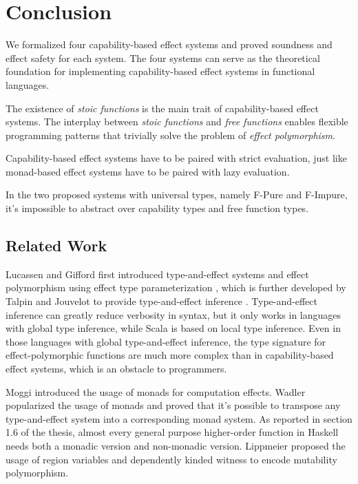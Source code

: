 \section{Conclusion}

We formalized four capability-based effect systems and proved
soundness and effect safety for each system. The four systems can
serve as the theoretical foundation for implementing capability-based
effect systems in functional languages.

The existence of \emph{stoic functions} is the main trait of
capability-based effect systems. The interplay between \emph{stoic
  functions} and \emph{free functions} enables flexible programming
patterns that trivially solve the problem of \emph{effect
  polymorphism}.

Capability-based effect systems have to be paired with strict
evaluation, just like monad-based effect systems have to be paired
with lazy evaluation.

In the two proposed systems with universal types, namely F-Pure and
F-Impure, it's impossible to abstract over capability types and free
function types.

\subsection{Related Work}

Lucassen and Gifford first introduced type-and-effect
systems\cite{gifford1986integrating} and effect polymorphism using
effect type parameterization \cite{lucassen1988polymorphic}, which is
further developed by Talpin and Jouvelot to provide type-and-effect
inference \cite{talpin1992polymorphic,
  talpin1994type}. Type-and-effect inference can greatly reduce
verbosity in syntax, but it only works in languages with global type
inference, while Scala is based on local type inference. Even in those
languages with global type-and-effect inference, the type signature
for effect-polymorphic functions are much more complex than in
capability-based effect systems, which is an obstacle to programmers.

Moggi introduced the usage of monads for computation
effects\cite{moggi1991notions}. Wadler popularized the usage of
monads\cite{wadler1992comprehending, wadler1995monads} and proved that
it's possible to transpose any type-and-effect system into a
corresponding monad system\cite{wadler2003marriage}. As reported in
section 1.6 of the thesis\cite{lippmeier2009type}, almost every
general purpose higher-order function in Haskell needs both a monadic
version and non-monadic version. Lippmeier proposed the usage of
region variables and dependently kinded witness to encode mutability
polymorphism\cite{lippmeier2009witnessing}.

